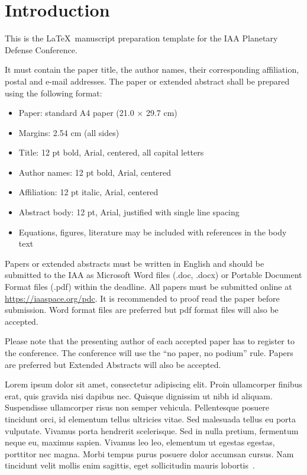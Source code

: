 
\section{Introduction}

This is the \LaTeX~manuscript preparation template for the IAA Planetary Defense Conference.

It must contain the paper title, the author names, their corresponding affiliation, postal and e-mail addresses. The paper or extended abstract shall be prepared using the following format:

\begin{itemize}
	\item Paper: standard A4 paper (21.0 $\times$ 29.7 cm)
	\item Margins: 2.54 cm (all sides)
	\item Title: 12 pt bold, Arial, centered, all capital letters
	\item Author names: 12 pt bold, Arial, centered
	\item Affiliation: 12 pt italic, Arial, centered
	\item Abstract body: 12 pt, Arial, justified with single line spacing
	\item Equations, figures, literature may be included with references in the body text
\end{itemize}

Papers or extended abstracts must be written in English and should be submitted to the IAA as Microsoft Word files (.doc, .docx) or Portable Document Format files (.pdf) within the deadline. All papers must be submitted online at \url{https://iaaspace.org/pdc}. It is recommended to proof read the paper before submission. Word format files are preferred but pdf format files will also be accepted.

Please note that the presenting author of each accepted paper has to register to the conference. The conference will use the “no paper, no podium” rule. Papers are preferred but Extended Abstracts will also be accepted.


Lorem ipsum dolor sit amet, consectetur adipiscing elit. Proin ullamcorper
finibus erat, quis gravida nisi dapibus nec. Quisque dignissim ut nibh id aliquam. Suspendisse
ullamcorper risus non semper vehicula. Pellentesque posuere tincidunt orci, id elementum tellus
ultricies vitae. Sed malesuada tellus eu porta vulputate. Vivamus porta hendrerit scelerisque.
Sed in nulla pretium, fermentum neque eu, maximus sapien. Vivamus leo leo, elementum ut egestas
egestas, porttitor nec magna. Morbi tempus purus posuere dolor accumsan cursus. Nam tincidunt
velit mollis enim sagittis, eget sollicitudin mauris lobortis~\cite{SampleRef1, SampleRef2}.

